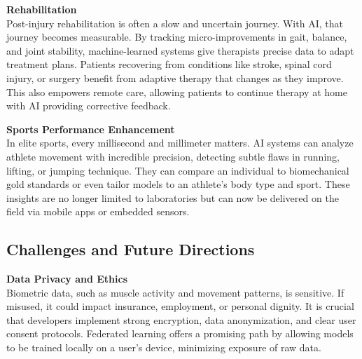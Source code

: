 \documentclass[a4paper,10pt,twocolumn]{memoir}
\newcommand{\highlight}[1]{\textcolor{accent}{\textbf{#1}}}
\newcommand{\highlight}[1]{\textcolor{accent}{\textbf{#1}}}
\begin{document}
\highlight{Rehabilitation} \\
Post-injury rehabilitation is often a slow and uncertain journey. With AI, that journey becomes measurable. By tracking micro-improvements in gait, balance, and joint stability, machine-learned systems give therapists precise data to adapt treatment plans. Patients recovering from conditions like stroke, spinal cord injury, or surgery benefit from adaptive therapy that changes as they improve. This also empowers remote care, allowing patients to continue therapy at home with AI providing corrective feedback.

\highlight{Sports Performance Enhancement} \\
In elite sports, every millisecond and millimeter matters. AI systems can analyze athlete movement with incredible precision, detecting subtle flaws in running, lifting, or jumping technique. They can compare an individual to biomechanical gold standards or even tailor models to an athlete's body type and sport. These insights are no longer limited to laboratories but can now be delivered on the field via mobile apps or embedded sensors.



\subsection*{Challenges and Future Directions}

\highlight{Data Privacy and Ethics} \\
Biometric data, such as muscle activity and movement patterns, is sensitive. If misused, it could impact insurance, employment, or personal dignity. It is crucial that developers implement strong encryption, data anonymization, and clear user consent protocols. Federated learning offers a promising path by allowing models to be trained locally on a user's device, minimizing exposure of raw data.
\end{document}
